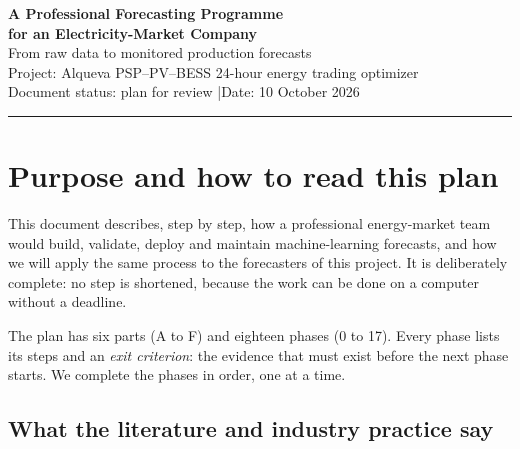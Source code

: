 \documentclass[11pt,a4paper]{article}
\begin{document}
\begin{center}
{\LARGE\bfseries\color{accent} A Professional Forecasting Programme\\[2pt]for an Electricity-Market Company}\\[8pt]
{\large From raw data to monitored production forecasts}\\[6pt]
{\normalsize Project: Alqueva PSP--PV--BESS 24-hour energy trading optimizer\\
Document status: plan for review \quad|\quad Date: 10 October 2026}
\end{center}

\vspace{4pt}
\hrule
\vspace{6pt}

\section{Purpose and how to read this plan}

This document describes, step by step, how a professional energy-market team would build,
validate, deploy and maintain machine-learning forecasts, and how we will apply the same
process to the forecasters of this project. It is deliberately complete: no step is
shortened, because the work can be done on a computer without a deadline.

The plan has six parts (A to F) and eighteen phases (0 to 17). Every phase lists its steps and an
\emph{exit criterion}: the evidence that must exist before the next phase starts. We complete the phases
in order, one at a time.

\subsection*{What the literature and industry practice say}
\end{document}
